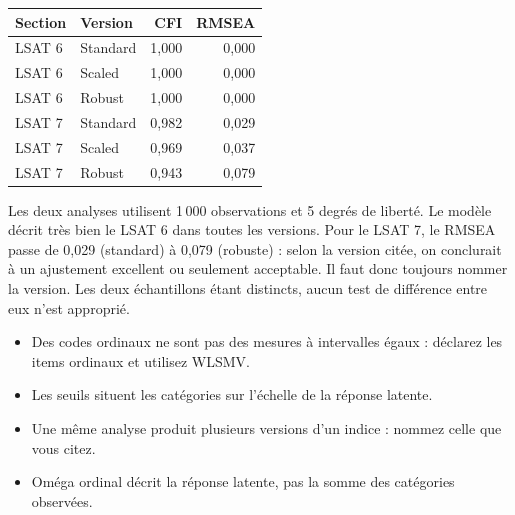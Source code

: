 \documentclass[
  french,
  11pt,
  a4paper,
  DIV=11,
  numbers=noendperiod]{scrreprt}
\newcounter{none} %
\providecommand{\tightlist}{%
  \setlength{\itemsep}{0pt}\setlength{\parskip}{0pt}}
\begin{document}
\begin{tcolorbox}[enhanced jigsaw, arc=.35mm, bottomrule=.15mm, bottomtitle=1mm, breakable, colback=white, colbacktitle=quarto-callout-tip-color!10!white, colframe=quarto-callout-tip-color-frame, coltitle=black, left=2mm, leftrule=.75mm, opacityback=0, opacitybacktitle=0.6, rightrule=.15mm, title={Réponse}, titlerule=0mm, toprule=.15mm, toptitle=1mm]


{\def\LTcaptype{none} %
\begin{longtable}[]{@{}llrr@{}}
\toprule\noalign{}
Section & Version & CFI & RMSEA \\
\midrule\noalign{}
\endhead
\bottomrule\noalign{}
\endlastfoot
LSAT 6 & Standard & 1,000 & 0,000 \\
LSAT 6 & Scaled & 1,000 & 0,000 \\
LSAT 6 & Robust & 1,000 & 0,000 \\
LSAT 7 & Standard & 0,982 & 0,029 \\
LSAT 7 & Scaled & 0,969 & 0,037 \\
LSAT 7 & Robust & 0,943 & 0,079 \\
\end{longtable}
}

Les deux analyses utilisent 1\,000 observations et 5 degrés de liberté.
Le modèle décrit très bien le LSAT 6 dans toutes les versions. Pour le
LSAT 7, le RMSEA passe de 0,029 (standard) à 0,079 (robuste) : selon la
version citée, on conclurait à un ajustement excellent ou seulement
acceptable. Il faut donc toujours nommer la version. Les deux
échantillons étant distincts, aucun test de différence entre eux n'est
approprié.

\end{tcolorbox}

\begin{tcolorbox}[enhanced jigsaw, arc=.35mm, bottomrule=.15mm, bottomtitle=1mm, breakable, colback=white, colbacktitle=quarto-callout-important-color!10!white, colframe=quarto-callout-important-color-frame, coltitle=black, left=2mm, leftrule=.75mm, opacityback=0, opacitybacktitle=0.6, rightrule=.15mm, title={À retenir}, titlerule=0mm, toprule=.15mm, toptitle=1mm]

\begin{itemize}
\tightlist
\item
  Des codes ordinaux ne sont pas des mesures à intervalles égaux :
  déclarez les items ordinaux et utilisez WLSMV.
\item
  Les seuils situent les catégories sur l'échelle de la réponse latente.
\item
  Une même analyse produit plusieurs versions d'un indice : nommez celle
  que vous citez.
\item
  Oméga ordinal décrit la réponse latente, pas la somme des catégories
  observées.
\end{itemize}

\end{tcolorbox}
\end{document}
